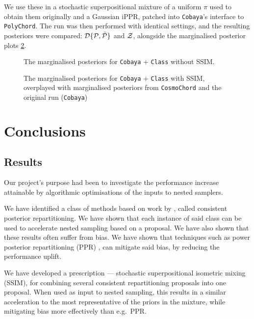 \documentclass[usenatbib]{mnras}
\begin{document}
We use these in a stochastic superpositional mixture of a uniform
$\pi$ used to obtain them originally and a Gaussian iPPR, patched into
\texttt{Cobaya}'s interface to \texttt{PolyChord}. The run was then
performed with identical settings, and the resulting posteriors were
compared: ${\cal D}\{ {\cal P}, \bar{\cal P}\}$ and ${\cal Z}$,
alongside the marginalised posterior plots \cref{fig:cosmology-cmp}. 
\begin{landscape}
\begin{figure}
  \centering %
  
  \caption{The marginalised posteriors for \texttt{Cobaya} +
    \texttt{Class} without SSIM. }\label{fig:cosmology}
\end{figure}
\end{landscape}

\begin{landscape}
\begin{figure}
  \centering %
  \caption{The marginalised posteriors for \texttt{Cobaya} +
    \texttt{Class} with SSIM, overplayed with marginalised posteriors
    from \texttt{CosmoChord} and the original run
    (\texttt{Cobaya})}\label{fig:cosmology-cmp}
\end{figure}
\end{landscape}

\section{Conclusions}\label{sec:orgdf2cbd9}

\subsection{Results}\label{sec:orgc48c55d}
Our project's purpose had been to investigate the performance
increase attainable by algorithmic optimisations of the inputs to
nested samplers.

We have identified a class of methods based on work by
\cite{chen-ferroz-hobson}, called consistent posterior
repartitioning. We have shown that each instance of said class can be
used to accelerate nested sampling based on a proposal. We have also
shown that these results often suffer from bias. We have shown that
techniques such as power posterior repartitioning (PPR)
\cite{chen-ferroz-hobson}, can mitigate said bias, by reducing the
performance uplift.

We have developed a prescription --- stochastic superpositional
isometric mixing (SSIM), for combining several consistent repartitioning
proposals into one proposal. When used as input to nested sampling,
this results in a similar acceleration to the most representative of
the priors in the mixture, while mitigating bias more effectively than
e.g.~PPR.
\end{document}
